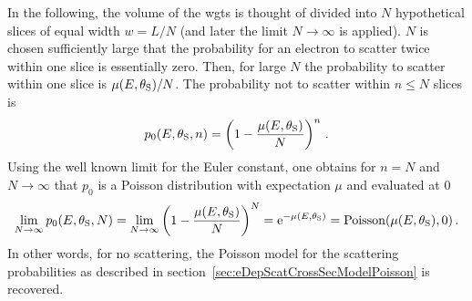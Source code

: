 In the following, the volume of the \gls{wgts} is thought of divided into $N$ hypothetical slices of equal width $w=L/N$ (and later the limit $N\rightarrow\infty$ is applied). $N$ is chosen sufficiently large that the probability for an electron to scatter twice within one slice is essentially zero. Then, for large $N$ the probability to scatter within one slice is $\mu(E,\theta_\mathrm{S})/N$. The probability not to scatter within $n \leq N$ slices is
\begin{equation}
p_0(E,\theta_\mathrm{S},n) =
\left(
1-\frac{\mu(E,\theta_\mathrm{S})}{N}
\right)^n
\text{\,.}
\end{equation}
Using the well known limit for the Euler constant, one obtains for $n=N$ and $N\rightarrow\infty$ that $p_0$ is a Poisson distribution with expectation $\mu$ and evaluated at 0 
\begin{align}
\label{eq:eDepScatCrossSecExtendedModelFormalismRecoveryOfPoisson}
\lim_{N\rightarrow\infty} 
p_0(E,\theta_\mathrm{S},N) =
\lim_{N\rightarrow\infty} 
\left(
1-\frac{\mu(E,\theta_\mathrm{S})}{N}
\right)^N =
\mathrm{e}^{-\mu(E,\theta_\mathrm{S})} = 
\mathrm{Poisson}(\mu(E,\theta_\mathrm{S}), 0)
\text{\,.}
\end{align}
In other words, for no scattering, the Poisson model for the scattering probabilities as described in section~\ref{sec:eDepScatCrossSecModelPoisson} is recovered.

